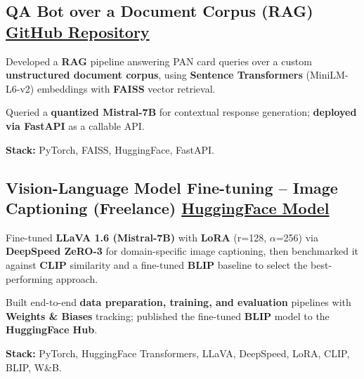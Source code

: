 \documentclass[letter,10pt]{article}
\begin{document}
\subsection{QA Bot over a Document Corpus (RAG) \hfill \href{https://github.com/sunil448832/Natural-Language-Processing/tree/master/RAG(Retrieval\%20Augment\%20Generation)}{GitHub Repository}}
\begin{zitemize}
\item Developed a \textbf{RAG} pipeline answering PAN card queries over a custom \textbf{unstructured document corpus}, using \textbf{Sentence Transformers} (MiniLM-L6-v2) embeddings with \textbf{FAISS} vector retrieval.
\item Queried a \textbf{quantized Mistral-7B} for contextual response generation; \textbf{deployed via FastAPI} as a callable API.
\item \textbf{Stack:} PyTorch, FAISS, HuggingFace, FastAPI.
\end{zitemize}

\subsection{Vision-Language Model Fine-tuning – Image Captioning (Freelance) \hfill \href{https://huggingface.co/sunil448832/blip-model}{HuggingFace Model}}
\begin{zitemize}
\item Fine-tuned \textbf{LLaVA 1.6 (Mistral-7B)} with \textbf{LoRA} (r=128, $\alpha$=256) via \textbf{DeepSpeed ZeRO-3} for domain-specific image captioning, then benchmarked it against \textbf{CLIP} similarity and a fine-tuned \textbf{BLIP} baseline to select the best-performing approach.
\item Built end-to-end \textbf{data preparation, training, and evaluation} pipelines with \textbf{Weights \& Biases} tracking; published the fine-tuned \textbf{BLIP} model to the \textbf{HuggingFace Hub}.
\item \textbf{Stack:} PyTorch, HuggingFace Transformers, LLaVA, DeepSpeed, LoRA, CLIP, BLIP, W\&B.
\end{zitemize}
\end{document}
